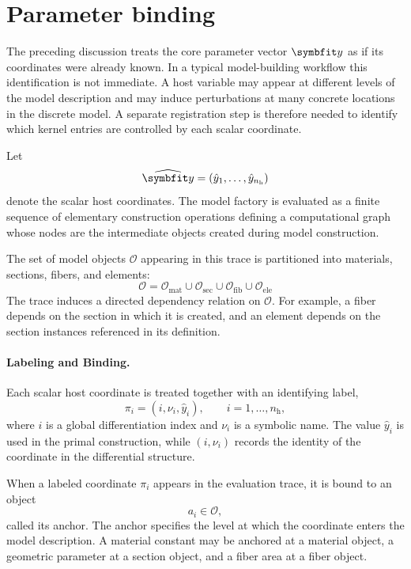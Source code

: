\section{Parameter binding}%
\label{sec:parameter-binding}
The preceding discussion treats the core parameter vector
\(\CoreParameters\) as if its coordinates were already known. 
In a typical model-building workflow this identification is not immediate.
A host variable may appear at different levels of the model description and may induce perturbations at many concrete locations in the discrete model. 
A separate registration step is therefore needed to identify which kernel entries are controlled by each scalar
coordinate.

Let
\[
\HostParameters = (\hat y_1,\ldots,\hat y_{n_{\mathrm h}})
\]
denote the scalar host coordinates. 
The model factory is evaluated as
a finite sequence of elementary construction operations defining a computational graph \citep{frostig2018compiling} whose nodes are the intermediate objects created during model construction. 

The set of model objects \(\mathcal{O}\) appearing in this trace is partitioned
into materials, sections, fibers, and elements:
\[
\mathcal{O}
=
\mathcal{O}_{\mathrm{mat}}
\cup
\mathcal{O}_{\mathrm{sec}}
\cup
\mathcal{O}_{\mathrm{fib}}
\cup
\mathcal{O}_{\mathrm{ele}}
\]
The trace induces a
directed dependency relation on \(\mathcal{O}\). 
For example, a fiber depends on the section in which it is created, and an element depends on the section instances referenced in its definition.

\paragraph{Labeling and Binding.}
Each scalar host coordinate is treated together with an identifying
label,
\[
\pi_i = (i,\nu_i,\hat y_i),
\qquad i=1,\ldots,n_{\mathrm h},
\]
where \(i\) is a global differentiation index and \(\nu_i\) is a
symbolic name. The value \(\hat y_i\) is used in the primal
construction, while \((i,\nu_i)\) records the identity of the
coordinate in the differential structure.

When a labeled coordinate \(\pi_i\) appears in the evaluation trace,
it is bound to an object
\[
a_i \in \mathcal{O},
\]
called its anchor. The anchor specifies the level at which the
coordinate enters the model description. 
A material constant may be anchored at
a material object, a geometric parameter at a section object, and a
fiber area at a fiber object. 

